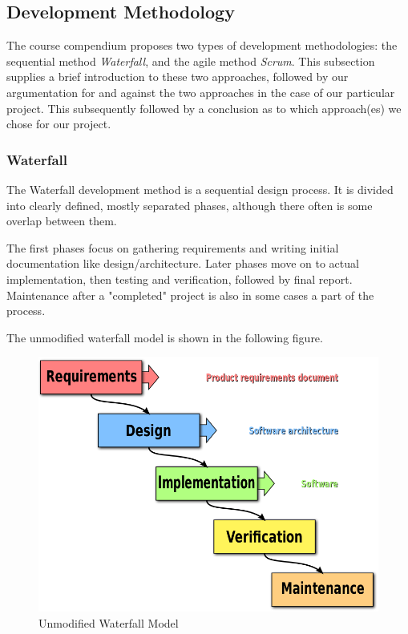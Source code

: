 \subsection{Development Methodology}
The course compendium proposes two types of development methodologies: the sequential method \emph{Waterfall}, and the agile method \emph{Scrum}. This subsection supplies a brief introduction to these two approaches, followed by our argumentation for and against the two approaches in the case of our particular project. This subsequently followed by a conclusion as to which approach(es) we chose for our project.

\newpage
\subsubsection{Waterfall}
The Waterfall development method is a sequential design process. It is divided into clearly defined, mostly separated phases, although there often is some overlap between them.

The first phases focus on gathering requirements and writing initial documentation like design/architecture. Later phases move on to actual implementation, then testing and verification, followed by final report. Maintenance after a "completed" project is also in some cases a part of the process.

The unmodified waterfall model is shown in the following figure.

\begin{figure}[H]
\centering
\includegraphics[width=1.0\textwidth]{images/Waterfall-model.png}
\caption{Unmodified Waterfall Model \cite{waterfallModel}}
\label{fig:Waterfall_model}
\end{figure}

